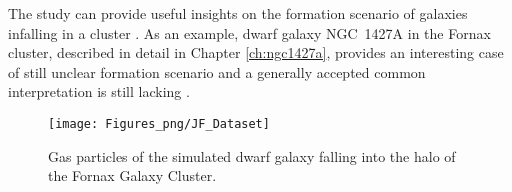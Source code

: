 
The study can provide useful insights on the formation scenario of galaxies infalling in a cluster \citep{Ebeling2013}.
As an example, dwarf galaxy NGC~1427A in the Fornax cluster, described in detail in Chapter \ref{ch:ngc1427a},
provides an interesting case of still unclear formation scenario and a generally accepted common interpretation is still lacking \citep{Lee-Waddell2018, Mora2015}.
\begin{figure}
  \centering
  \texttt{[image: Figures\_png/JF\_Dataset]}
  \caption{Gas particles of the simulated dwarf galaxy falling into the halo of the Fornax Galaxy Cluster.}
  \label{fig:JF_Dataset}
\end{figure}

